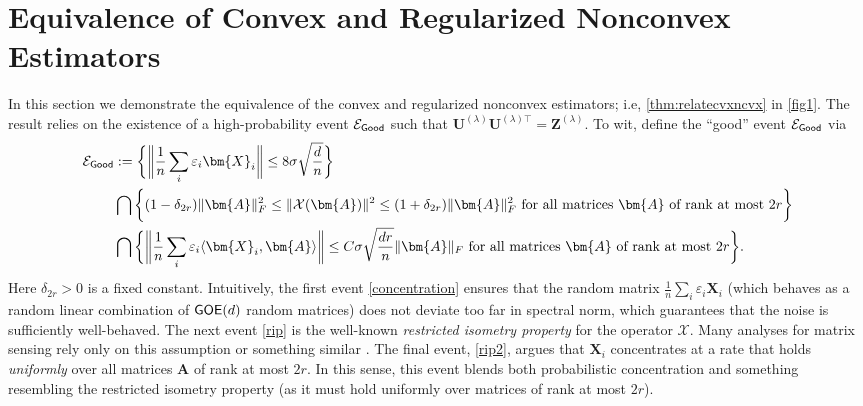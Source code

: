 \documentclass[10pt]{article}
\newcommand{\eps}{\ensuremath{\varepsilon}}
\theoremstyle{definition}
\begin{document}
\section{Equivalence of Convex and Regularized Nonconvex Estimators} \label{sec:equivalence}
In this section we demonstrate the equivalence of the convex and regularized nonconvex estimators; i.e, \cref{thm:relatecvxncvx} in \cref{fig1}.  The result relies on the existence of a high-probability event $\mathcal{E}_{{\sf Good}}$ such that $\bm{U}^{(\lambda)} \bm{U}^{(\lambda)\top} = \bm{Z}^{(\lambda)}$.  To wit, 
define the ``good'' event $\mathcal{E}_{{\sf Good}}$ via
\begin{subequations} 
\label{egood}
\begin{align}
    \mathcal{E}_{{\sf Good}} &:= \bigg\{ \bigg\| \frac{1}{n} \sum_i \eps_i \bm{X}_i \bigg\| \leq 8\sigma \sqrt{\frac{d}{n}}  \bigg\}  \label{concentration} \\
    &\bigcap \bigg\{ (1 - \delta_{2r}) \|\bm{A}\|_F^2 \leq  \|  \mathcal{X}( \bm{A}) \|^2 \leq (1 + \delta_{2r}) \|\bm{A} \|_F^2 \text{ for all matrices $\bm{A}$ of rank at most $2r$}   \bigg\}  \label{rip} \\
    &\bigcap \bigg\{ \bigg\| \frac{1}{n} \sum_{i} \eps_i \langle \bm{X}_i , \bm{A} \rangle \bigg\| \leq C \sigma \sqrt{\frac{dr}{n}}\| \bm{A} \|_F  \text{ for all matrices $\bm{A}$ of rank at most $2r$} \bigg\}. \label{rip2}
 \end{align}
 \end{subequations}
 Here $\delta_{2r} > 0$ is a fixed constant.  Intuitively, the first event \eqref{concentration} ensures that the random matrix $\frac{1}{n} \sum_{i} \eps_i \bm{X}_i$ (which behaves as a random linear combination of ${\sf GOE}(d)$ random matrices) does not deviate too far in spectral norm, which guarantees that the noise is sufficiently well-behaved.  The next event \eqref{rip} is the well-known \emph{restricted isometry property} for the operator $\mathcal{X}$.  Many analyses for matrix sensing rely only on this assumption or something similar \citep{zhang_sharp_2021,zheng_convergent_2015,zhang_fast_2023,ge_no_2017,ma_beyond_2021,soltanolkotabi_implicit_2025,stoger_small_2021}. The final event, \eqref{rip2}, argues that $\bm{X}_i$ concentrates at a rate that holds \emph{uniformly} over all matrices $\bm{A}$ of rank at most $2r$.  In this sense, this event blends both probabilistic concentration and something resembling the restricted isometry property (as it must hold uniformly over matrices of rank at most $2r$).  
\end{document}
